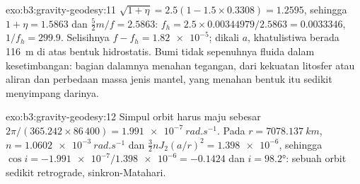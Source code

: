 \begin{solution}{exo:b3:gravity-geodesy:11}
$\sqrt{1 + \eta} = 2.5(1 - 1.5\times0.3308) = 1.2595$, sehingga $1 + \eta = 1.5863$
dan $\tfrac52m/f = 2.5863$: $f_h = 2.5\times0.00344979/2.5863 = \num{0.0033346}$,
$1/f_h = 299.9$. Selisihnya $f - f_h = \num{1.82e-5}$; dikali $a$,
khatulistiwa berada \qty{116}{m} di atas bentuk hidrostatis. Bumi tidak sepenuhnya
fluida dalam kesetimbangan: bagian dalamnya menahan tegangan, dari kekuatan
litosfer atau aliran dan perbedaan massa jenis mantel, yang menahan
bentuk itu sedikit menyimpang darinya.
\end{solution}

\begin{solution}{exo:b3:gravity-geodesy:12}
Simpul orbit harus maju sebesar $2\pi/(365.242\times86\,400) =
\qty{1.991e-7}{rad.s^{-1}}$. Pada $r = \qty{7078.137}{km}$, $n =
\qty{1.0602e-3}{rad.s^{-1}}$ dan $\tfrac32nJ_2(a/r)^2 = \num{1.398e-6}$, sehingga
$\cos i = -\num{1.991e-7}/\num{1.398e-6} = -0.1424$ dan $i = \ang{98.2}$: sebuah
orbit sedikit retrograde, sinkron-Matahari.
\end{solution}

